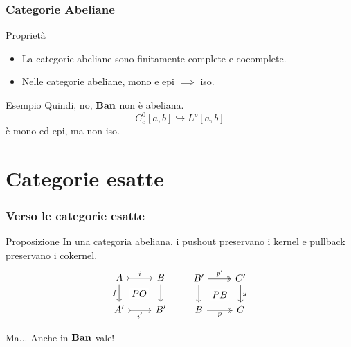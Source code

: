\documentclass{beamer}
\begin{document}
\begin{frame}
  \frametitle{Categorie Abeliane}

  \begin{block}{Proprietà}
    \begin{itemize}
    \item La categorie abeliane sono finitamente complete e cocomplete.
    \item Nelle categorie abeliane, mono e epi \(\implies\) iso.
    \end{itemize}
  \end{block}

  \begin{block}{Esempio}
    Quindi, no, \(\mathbf{Ban}\) \alert{non} è abeliana.
    \[
      C_c^0[a, b] \hookrightarrow L^p[a, b]
    \]
    è mono ed epi, ma non iso.
  \end{block}
  
\end{frame}







\section{Categorie esatte}

\begin{frame}[fragile]
  \frametitle{Verso le categorie esatte}

  \begin{block}{Proposizione}
    In una categoria abeliana, i pushout preservano i kernel e pullback
    preservano i cokernel.
    \[
      \begin{tikzcd}
        A \ar["{f}", d, swap] \ar["{PO}" description, phantom, dr] \ar["{i}", rightarrowtail, r] & B \ar["{}", d] \\
        A' \ar["{i'}", rightarrowtail, r, swap] & B'
      \end{tikzcd}
      \qquad
            \begin{tikzcd}
        B' \ar["{}", d] \ar["{PB}" description, dr, phantom] \ar["{p'}", twoheadrightarrow, r] & C' \ar["{g}", d] \\
        B \ar["{p}", twoheadrightarrow, r, swap] & C
      \end{tikzcd}
    \]
  \end{block}

  \pause
  
  \begin{block}{Ma...}
    Anche in \(\mathbf{Ban}\) vale!
  \end{block}
  
\end{frame}
\end{document}
